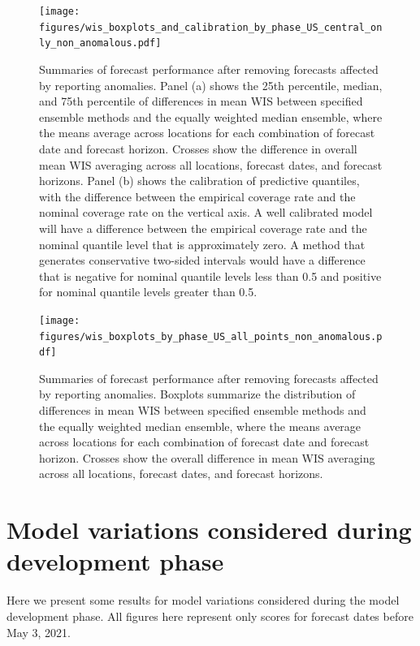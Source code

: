 \documentclass{article}
\begin{document}
\begin{figure}[H]
  \texttt{[image: figures/wis\_boxplots\_and\_calibration\_by\_phase\_US\_central\_only\_non\_anomalous.pdf]}
  \caption{Summaries of forecast performance after removing forecasts affected by reporting anomalies. Panel (a) shows the 25th percentile, median, and 75th percentile of differences in mean WIS between specified ensemble methods and the equally weighted median ensemble, where the means average across locations for each combination of forecast date and forecast horizon. Crosses show the difference in overall mean WIS averaging across all locations, forecast dates, and forecast horizons. Panel (b) shows the calibration of predictive quantiles, with the difference between the empirical coverage rate and the nominal coverage rate on the vertical axis. A well calibrated model will have a difference between the empirical coverage rate and the nominal quantile level that is approximately zero. A method that generates conservative two-sided intervals would have a difference that is negative for nominal quantile levels less than 0.5 and positive for nominal quantile levels greater than 0.5.}
  \label{fig:wis_calibration_us_non_anomalous}
\end{figure}

\begin{figure}[H]
  \texttt{[image: figures/wis\_boxplots\_by\_phase\_US\_all\_points\_non\_anomalous.pdf]}
  \caption{Summaries of forecast performance after removing forecasts affected by reporting anomalies. Boxplots summarize the distribution of differences in mean WIS between specified ensemble methods and the equally weighted median ensemble, where the means average across locations for each combination of forecast date and forecast horizon. Crosses show the overall difference in mean WIS averaging across all locations, forecast dates, and forecast horizons.}
  \label{fig:wis_calibration_us_non_anomalous_all_points}
\end{figure}

\newpage

\section{Model variations considered during development phase}

Here we present some results for model variations considered during the model development phase. All figures here represent only scores for forecast dates before May 3, 2021.
\end{document}
